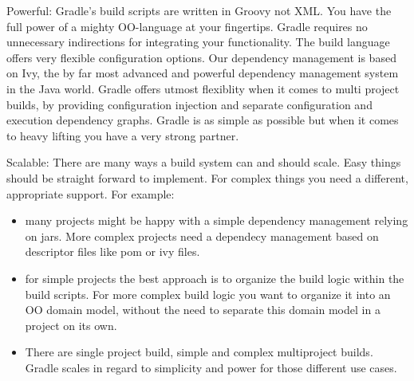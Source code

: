 Powerful: Gradle's build scripts are written in Groovy not XML. You have the full power of a mighty OO-language at your fingertips. Gradle requires no unnecessary indirections for integrating your functionality. The build language offers very flexible configuration options. Our dependency management is based on Ivy, the by far most advanced and powerful dependency management system in the Java world. Gradle offers utmost flexiblity when it comes to multi project builds, by providing configuration injection and separate configuration and execution dependency graphs. Gradle is as simple as possible but when it comes to heavy lifting you have a very strong partner.

Scalable: There are many ways a build system can and should scale. Easy things should be straight forward to implement. For complex things you need a different, appropriate support. For example:

\begin{itemize}
	\item many projects might be happy with a simple dependency management relying on jars. More complex projects need a dependecy management based on descriptor files like pom or ivy files.
    \item for simple projects the best approach is to organize the build logic within the build scripts. For more complex build logic you want to organize it into an OO domain model, without the need to separate this domain model in a project on its own.
    \item There are single project build, simple and complex multiproject builds. Gradle scales in regard to simplicity and power for those different use cases.
\end{itemize}
    

